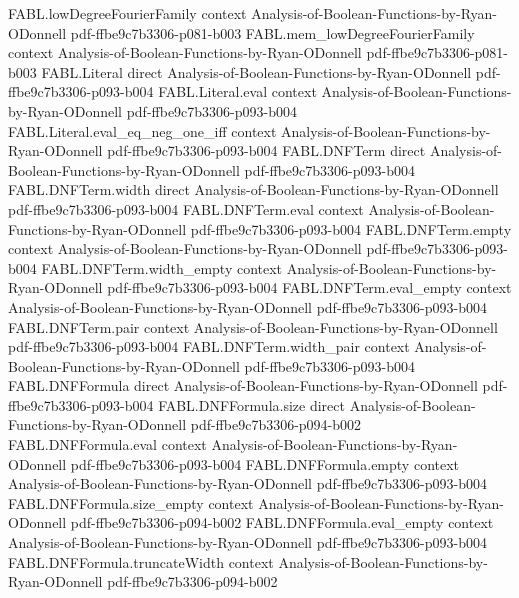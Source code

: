 \begin{theorem}
  {FABL.lowDegreeFourierFamily}
  {context}
  {Analysis-of-Boolean-Functions-by-Ryan-ODonnell}
  {pdf-ffbe9c7b3306-p081-b003}
\proofstep
  {FABL.mem_lowDegreeFourierFamily}
  {context}
  {Analysis-of-Boolean-Functions-by-Ryan-ODonnell}
  {pdf-ffbe9c7b3306-p081-b003}
\proofstep
  {FABL.Literal}
  {direct}
  {Analysis-of-Boolean-Functions-by-Ryan-ODonnell}
  {pdf-ffbe9c7b3306-p093-b004}
\proofstep
  {FABL.Literal.eval}
  {context}
  {Analysis-of-Boolean-Functions-by-Ryan-ODonnell}
  {pdf-ffbe9c7b3306-p093-b004}
\proofstep
  {FABL.Literal.eval_eq_neg_one_iff}
  {context}
  {Analysis-of-Boolean-Functions-by-Ryan-ODonnell}
  {pdf-ffbe9c7b3306-p093-b004}
\proofstep
  {FABL.DNFTerm}
  {direct}
  {Analysis-of-Boolean-Functions-by-Ryan-ODonnell}
  {pdf-ffbe9c7b3306-p093-b004}
\proofstep
  {FABL.DNFTerm.width}
  {direct}
  {Analysis-of-Boolean-Functions-by-Ryan-ODonnell}
  {pdf-ffbe9c7b3306-p093-b004}
\proofstep
  {FABL.DNFTerm.eval}
  {context}
  {Analysis-of-Boolean-Functions-by-Ryan-ODonnell}
  {pdf-ffbe9c7b3306-p093-b004}
\proofstep
  {FABL.DNFTerm.empty}
  {context}
  {Analysis-of-Boolean-Functions-by-Ryan-ODonnell}
  {pdf-ffbe9c7b3306-p093-b004}
\proofstep
  {FABL.DNFTerm.width_empty}
  {context}
  {Analysis-of-Boolean-Functions-by-Ryan-ODonnell}
  {pdf-ffbe9c7b3306-p093-b004}
\proofstep
  {FABL.DNFTerm.eval_empty}
  {context}
  {Analysis-of-Boolean-Functions-by-Ryan-ODonnell}
  {pdf-ffbe9c7b3306-p093-b004}
\proofstep
  {FABL.DNFTerm.pair}
  {context}
  {Analysis-of-Boolean-Functions-by-Ryan-ODonnell}
  {pdf-ffbe9c7b3306-p093-b004}
\proofstep
  {FABL.DNFTerm.width_pair}
  {context}
  {Analysis-of-Boolean-Functions-by-Ryan-ODonnell}
  {pdf-ffbe9c7b3306-p093-b004}
\proofstep
  {FABL.DNFFormula}
  {direct}
  {Analysis-of-Boolean-Functions-by-Ryan-ODonnell}
  {pdf-ffbe9c7b3306-p093-b004}
\proofstep
  {FABL.DNFFormula.size}
  {direct}
  {Analysis-of-Boolean-Functions-by-Ryan-ODonnell}
  {pdf-ffbe9c7b3306-p094-b002}
\proofstep
  {FABL.DNFFormula.eval}
  {context}
  {Analysis-of-Boolean-Functions-by-Ryan-ODonnell}
  {pdf-ffbe9c7b3306-p093-b004}
\proofstep
  {FABL.DNFFormula.empty}
  {context}
  {Analysis-of-Boolean-Functions-by-Ryan-ODonnell}
  {pdf-ffbe9c7b3306-p093-b004}
\proofstep
  {FABL.DNFFormula.size_empty}
  {context}
  {Analysis-of-Boolean-Functions-by-Ryan-ODonnell}
  {pdf-ffbe9c7b3306-p094-b002}
\proofstep
  {FABL.DNFFormula.eval_empty}
  {context}
  {Analysis-of-Boolean-Functions-by-Ryan-ODonnell}
  {pdf-ffbe9c7b3306-p093-b004}
\proofstep
  {FABL.DNFFormula.truncateWidth}
  {context}
  {Analysis-of-Boolean-Functions-by-Ryan-ODonnell}
  {pdf-ffbe9c7b3306-p094-b002}

\end{theorem}
